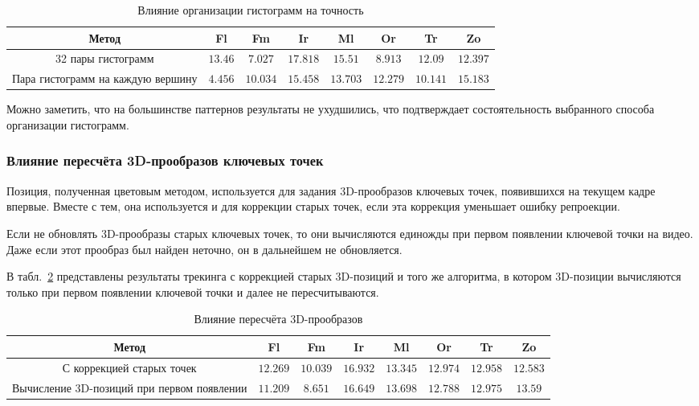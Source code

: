 
\begin{table}[h]
\caption{\label{tab:full_hist}Влияние организации гистограмм на точность}
\begin{center}
\begin{tabular}{|c|c|c|c|c|c|c|c|}
\hline
Метод & Fl & Fm & Ir & Ml & Or & Tr & Zo \\
\hline
32 пары гистограмм & $13.46$ & $7.027$ & $17.818$ & $15.51$ & $8.913$ & $12.09$ & $12.397$ \\
\hline
Пара гистограмм на каждую вершину & $4.456$ & $10.034$ & $15.458$ & $13.703$ & $12.279$ & $10.141$ & $15.183$ \\
\hline
\end{tabular}
\end{center}
\end{table}

Можно заметить, что на большинстве паттернов результаты не ухудшились, что подтверждает состоятельность выбранного способа организации гистограмм.

\subsubsection{Влияние пересчёта 3D-прообразов ключевых точек}

Позиция, полученная цветовым методом, используется для задания 3D-прообразов
ключевых точек, появившихся на текущем кадре впервые.
Вместе с тем, она используется и для коррекции старых точек, если эта коррекция уменьшает ошибку репроекции.

Если не обновлять 3D-прообразы старых ключевых точек, то они вычисляются единожды при первом появлении ключевой точки на видео.
Даже если этот прообраз был найден неточно, он в дальнейшем не обновляется.

В табл.~\ref{tab:reprojection} представлены результаты трекинга с коррекцией
старых 3D-позиций и того же алгоритма, в котором 3D-позиции вычисляются
только при первом появлении ключевой точки и далее не пересчитываются.

\begin{table}[h]
\caption{\label{tab:reprojection}Влияние пересчёта 3D-прообразов}
\begin{center}
\begin{tabular}{|c|c|c|c|c|c|c|c|}
\hline
Метод & Fl & Fm & Ir & Ml & Or & Tr & Zo \\
\hline
С коррекцией старых точек & $12.269$ & $10.039$ & $16.932$ & $13.345$ &
$12.974$ &
$12.958$ & $12.583$ \\
\hline
Вычисление 3D-позиций при первом появлении & $11.209$ & $8.651$ & $16.649$ &
$13.698$ & $12.788$ & $12.975$ &
$13.59$ \\
\hline
\end{tabular}
\end{center}
\end{table}

